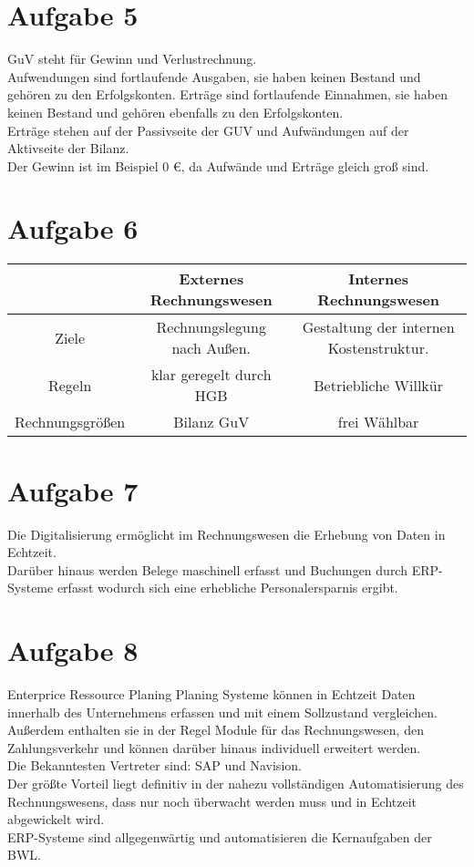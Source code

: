 \documentclass{article}
\begin{document}
	\section*{Aufgabe 5}
	GuV steht für Gewinn und Verlustrechnung. \\
	Aufwendungen sind fortlaufende Ausgaben, sie haben keinen Bestand und gehören zu den Erfolgskonten. Erträge sind fortlaufende Einnahmen, sie haben keinen Bestand und gehören ebenfalls zu den Erfolgskonten. \\
	Erträge stehen auf der Passivseite der GUV und Aufwändungen auf der Aktivseite der Bilanz. \\
	Der Gewinn ist im Beispiel 0 €, da Aufwände und Erträge gleich groß sind.
	\section*{Aufgabe 6}
	\begin{tabular}{|c|c|c|}
		& Externes Rechnungswesen & Internes Rechnungswesen \\
		\hline
		Ziele & Rechnungslegung nach Außen.& Gestaltung der internen Kostenstruktur. \\
		Regeln & klar geregelt durch HGB& Betriebliche Willkür\\
		Rechnungsgrößen & Bilanz GuV & frei Wählbar 
	\end{tabular}
	\section*{Aufgabe 7}
	Die Digitalisierung ermöglicht im Rechnungswesen die Erhebung von Daten in Echtzeit. \\
	Darüber hinaus werden Belege maschinell erfasst und Buchungen durch ERP-Systeme erfasst wodurch sich eine erhebliche Personalersparnis ergibt. 
	\section*{Aufgabe 8}
	Enterprice Ressource Planing Planing Systeme können in Echtzeit Daten innerhalb des Unternehmens erfassen und mit einem Sollzustand vergleichen. Außerdem enthalten sie in der Regel Module für das Rechnungswesen, den Zahlungsverkehr und können darüber hinaus individuell erweitert werden. \\
	Die Bekanntesten Vertreter sind: SAP und Navision. \\
	Der größte Vorteil liegt definitiv in der nahezu vollständigen Automatisierung des Rechnungswesens, dass nur noch überwacht werden muss und in Echtzeit abgewickelt wird. \\
	ERP-Systeme sind allgegenwärtig und automatisieren die Kernaufgaben der BWL.
\end{document}
